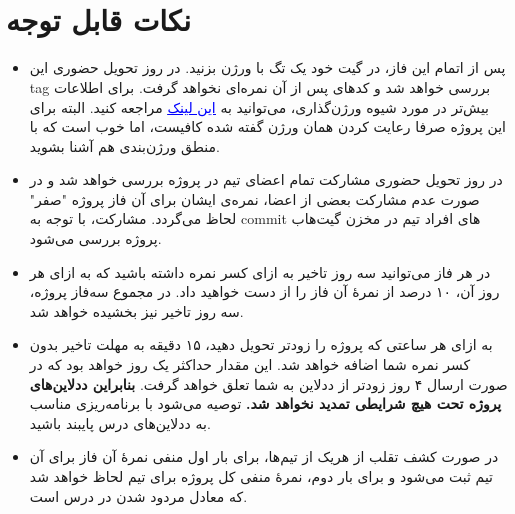 \documentclass[]{article}
\begin{document}
\newpage
\pagestyle{fancy}
\fancyhf{}
\fancyfoot{}
\cfoot{\thepage}
\renewcommand{\headrulewidth}{2pt}

\KashidaOff



\tableofcontents

\newpage

 \Large \textbf{\\\\
}


\section*{{\titr نکات قابل توجه}}
\begin{itemize}
\item
پس از اتمام این فاز، در گیت خود یک تگ با ورژن  بزنید. در روز تحویل حضوری این tag بررسی خواهد شد و کدهای پس از آن نمره‌ای نخواهد گرفت. برای اطلاعات بیش‌تر در مورد شیوه ورژن‌گذاری، می‌توانید به
 \href{https://semver.org/}{\textcolor{blue}{\underline{این لینک}}}
 مراجعه کنید. البته برای این پروژه صرفا رعایت کردن همان ورژن گفته شده کافیست، اما خوب‌ است که با منطق ورژن‌بندی هم آشنا بشوید.

\item
در روز تحویل حضوری مشارکت تمام اعضای تیم در پروژه بررسی خواهد‌ شد و در صورت عدم مشارکت بعضی از اعضا، نمره‌ی ایشان برای آن فاز پروژه "صفر" لحاظ می‌گردد. مشارکت، با توجه به commit های افراد تیم در مخزن گیت‌هاب پروژه بررسی می‌شود.

\item
در هر فاز می‌توانید سه روز تاخیر به ازای کسر نمره داشته‌ باشید که به ازای هر روز آن، ۱۰ درصد از نمرهٔ آن فاز را از دست خواهید‌ داد. در مجموع سه‌فاز پروژه، سه روز تاخیر نیز بخشیده خواهد‌ شد.

\item
به ازای هر ساعتی که پروژه را زودتر تحویل دهید، ۱۵ دقیقه به مهلت تاخیر بدون کسر نمره شما اضافه خواهد‌ شد. این مقدار حداکثر یک روز خواهد‌ بود که در صورت ارسال ۴ روز زودتر از ددلاین به شما تعلق خواهد گرفت. \textbf{بنابراین ددلاین‌های پروژه تحت هیچ شرایطی تمدید نخواهد‌ شد.} توصیه می‌شود با برنامه‌ریزی مناسب به ددلاین‌های درس پایبند باشید.

\item
در صورت کشف تقلب از هریک از تیم‌ها، برای بار اول منفی نمرهٔ آن فاز برای آن تیم ثبت می‌شود و برای بار دوم، نمرهٔ منفی کل پروژه برای تیم لحاظ خواهد‌ شد که معادل مردود شدن در درس است.
\end{itemize}
\end{document}
